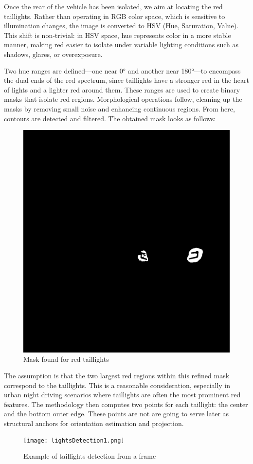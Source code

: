 Once the rear of the vehicle has been isolated, we aim at locating the red taillights. Rather than operating in RGB color space, which is sensitive to illumination changes, the image is converted to HSV (Hue, Saturation, Value). This shift is non-trivial: in HSV space, hue represents color in a more stable manner, making red easier to isolate under variable lighting conditions such as shadows, glares, or overexposure.

Two hue ranges are defined—one near 0° and another near 180°—to encompass the dual ends of the red spectrum, since taillights have a stronger red in the heart of lights and a lighter red around them. These ranges are used to create binary masks that isolate red regions. Morphological operations follow, cleaning up the masks by removing small noise and enhancing continuous regions. From here, contours are detected and filtered. The obtained mask looks as follows:

\begin{figure}[htbp]
    \centering
    \includegraphics[width=0.5\linewidth]{Images//featureExtractions/redLightsMask.png}
    \caption{Mask found for red taillights}
    \label{fig:redLightsMask}
\end{figure}

The assumption is that the two largest red regions within this refined mask correspond to the taillights. This is a reasonable consideration, especially in urban night driving scenarios where taillights are often the most prominent red features. The methodology then computes two points for each taillight: the center and the bottom outer edge. These points are not are going to serve later as structural anchors for orientation estimation and projection.

\begin{figure}[htbp]
    \centering
    \texttt{[image: lightsDetection1.png]}
    \caption{Example of taillights detection from a frame}
    \label{fig:lightsDetection}
\end{figure}

